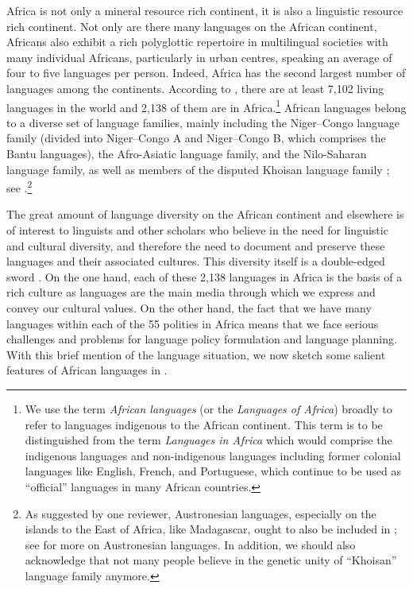 \documentclass[output=paper,hidelinks]{langscibook}
\begin{document}
Africa is not only a mineral resource rich continent, it is also a linguistic resource rich continent. Not only are there many languages on the African continent, Africans also exhibit a rich polyglottic repertoire in multilingual societies with many individual Africans, particularly in urban centres, speaking an average of four to five languages per person. Indeed, Africa has the second largest number of languages among the continents. According to \citet{Simons2020}, there are at least 7,102 living languages in the world and 2,138 of them are in Africa.\footnote{We use the term \textit{African languages} (or the \textit{Languages of Africa}) broadly to refer to languages indigenous to the African continent. This term is to be distinguished from the term \textit{Languages in Africa} which would comprise the indigenous languages and non-indigenous languages including former colonial languages like English, French, and Portuguese, which continue to be used as “official” languages in many African countries.} African languages belong to a diverse set of language families, mainly including the Niger–Congo language family (divided into Niger–Congo A and Niger–Congo B, which comprises the Bantu languages), the Afro-Asiatic language family, and the Nilo-Saharan language family, as well as members of the disputed Khoisan language family \citep{Guldemann:Khoisan}; see .\footnote{As suggested by one reviewer, Austronesian languages,
  especially on the islands to the East of Africa, like Madagascar,
  ought to also be included in ; see
   for more on Austronesian
  languages.  In addition, we
  should also acknowledge that not many people believe in the genetic
  unity of “Khoisan” language family anymore.}

The great amount of language diversity on the African
 continent and elsewhere is of interest to linguists and other scholars who believe in the need for linguistic and cultural diversity, and therefore the need to document and preserve these languages and their associated cultures. This diversity itself is a double-edged sword \citep{Bodomo2017}. On the one hand, each of these 2,138 languages in Africa is the basis of a rich culture as languages are the main media through which we express and convey our cultural values. On the other hand, the fact that we have many languages within each of the 55 polities in Africa means that we face serious challenges and problems for language policy formulation and language planning. With this brief mention of the language situation, we now sketch some salient features of African languages in .
\end{document}
